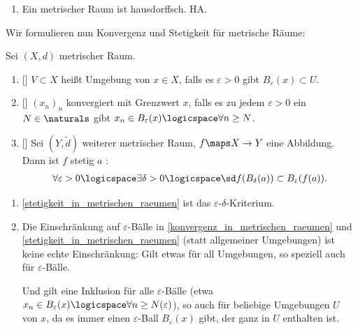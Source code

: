 \begin{bemerkungen}
\begin{enumerate}
\begin{proof}
        \end{proof}
        
        \item \label{metrischer_raum_ist_hausdorffsch} Ein metrischer Raum ist hausdorffsch. \tto HA. %
        
    \end{enumerate}
\end{bemerkungen}
Wir formulieren nun Konvergenz und Stetigkeit für metrische Räume:
\begin{bemerkungen}
    Sei \( (X,d) \) metrischer Raum.
    \begin{enumerate}
        \item {}[]\label{umgebung_in_metrischen_raeumen} \( V\subset X \) heißt Umgebung von \( x\in X \), falls es \( \varepsilon >0 \) gibt \sd \( B_\varepsilon(x)\subset U \).
        \item {}[]\label{konvergenz_in_metrischen_raeumen} \( (x_n)_n \) konvergiert mit Grenzwert \( x \), falls es zu jedem \( \varepsilon>0 \) ein \( N\in \naturals \) gibt \sd \( x_n\in B_\varepsilon(x)\logicspace\forall n\geq N \).
        \item {}[]\label{stetigkeit_in_metrischen_raeumen} Sei \( (Y,\tilde{d}) \) weiterer metrischer Raum, \( f\maps X \to Y \) eine Abbildung. Dann ist \( f \) stetig \( a \) \gdw:
        \begin{align*}
            \forall\varepsilon>0\logicspace\exists \delta>0\logicspace\sd f(B_\delta(a))\subset B_\varepsilon(f(a)).
        \end{align*}
    \end{enumerate}
\end{bemerkungen}
\begin{bemerkungen*}
    \begin{enumerate}
        \item \ref{stetigkeit_in_metrischen_raeumen} ist das \( \varepsilon \)-\( \delta \)-Kriterium.
        \item Die Einschränkung auf \( \varepsilon \)-Bälle in \ref{konvergenz_in_metrischen_raeumen} und \ref{stetigkeit_in_metrischen_raeumen} (statt allgemeiner Umgebungen) ist keine echte Einschränkung: Gilt etwas für all Umgebungen, so speziell auch für \( \varepsilon \)-Bälle.
        
        Und gilt eine Inklusion für alle \( \varepsilon \)-Bälle (etwa \( x_n\in B_\varepsilon(x)\logicspace\forall n \geq N(\varepsilon) \)), so auch für beliebige Umgebungen \( U \) von \( x \), da es immer einen \( \varepsilon \)-Ball \( B_\varepsilon(x) \) gibt, der ganz in \( U \) enthalten ist.
    \end{enumerate}
\end{bemerkungen*}
